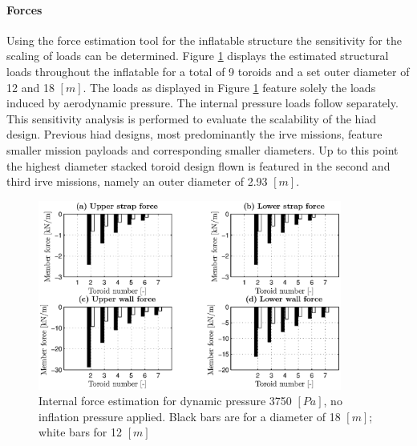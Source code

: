 \paragraph{Forces}

Using the force estimation tool for the inflatable structure the sensitivity for the scaling of loads can be determined. Figure \ref{fig:forces} displays the estimated structural loads throughout the inflatable for a total of 9 toroids and a set outer diameter of 12 and 18 $[m]$. The loads as displayed in Figure \ref{fig:forces} feature solely the loads induced by aerodynamic pressure. The internal pressure loads follow separately. This sensitivity analysis is performed to evaluate the scalability of the \gls{hiad} design. Previous \gls{hiad} designs, most predominantly the \gls{irve} missions, feature smaller mission payloads and corresponding smaller diameters. Up to this point the highest diameter stacked toroid design flown is featured in the second and third \gls{irve} missions, namely an outer diameter of 2.93 $[m]$. 

\begin{figure}[h]
	\centering
	\includegraphics[width=0.89\textwidth]{./Figure/Structure/forces_nopress_test.eps}
	\caption[{Internal force estimation for dynamic pressure 3750 $[Pa]$, no inflation pressure applied}]{Internal force estimation for dynamic pressure 3750 $[Pa]$, no inflation pressure applied. Black bars are for a diameter of 18 $[m]$; white bars for 12 $[m]$}
	\label{fig:forces}
\vspace{-4mm}
\end{figure}

